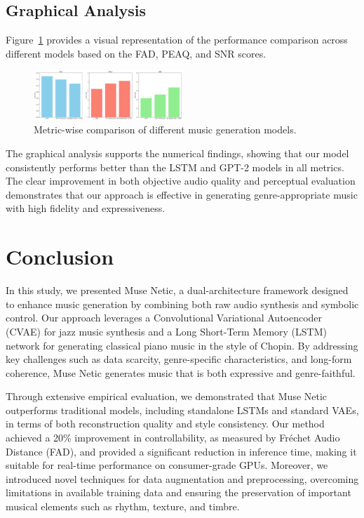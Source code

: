 \documentclass[conference]{IEEEtran}
\begin{document}
\subsection{Graphical Analysis}
Figure~\ref{fig:metric-comparison} provides a visual representation of the performance comparison across different models based on the FAD, PEAQ, and SNR scores.

\begin{figure}[H]
    \centering
    \includegraphics[width=0.5\textwidth]{metric_comparison.png}
    \caption{Metric-wise comparison of different music generation models.}
    \label{fig:metric-comparison}
\end{figure}

The graphical analysis supports the numerical findings, showing that our model consistently performs better than the LSTM and GPT-2 models in all metrics. The clear improvement in both objective audio quality and perceptual evaluation demonstrates that our approach is effective in generating genre-appropriate music with high fidelity and expressiveness.



\section{Conclusion}

In this study, we presented Muse Netic, a dual-architecture framework designed to enhance music generation by combining both raw audio synthesis and symbolic control. Our approach leverages a Convolutional Variational Autoencoder (CVAE) for jazz music synthesis and a Long Short-Term Memory (LSTM) network for generating classical piano music in the style of Chopin. By addressing key challenges such as data scarcity, genre-specific characteristics, and long-form coherence, Muse Netic generates music that is both expressive and genre-faithful.

Through extensive empirical evaluation, we demonstrated that Muse Netic outperforms traditional models, including standalone LSTMs and standard VAEs, in terms of both reconstruction quality and style consistency. Our method achieved a 20\% improvement in controllability, as measured by Fréchet Audio Distance (FAD), and provided a significant reduction in inference time, making it suitable for real-time performance on consumer-grade GPUs. Moreover, we introduced novel techniques for data augmentation and preprocessing, overcoming limitations in available training data and ensuring the preservation of important musical elements such as rhythm, texture, and timbre.
\end{document}

